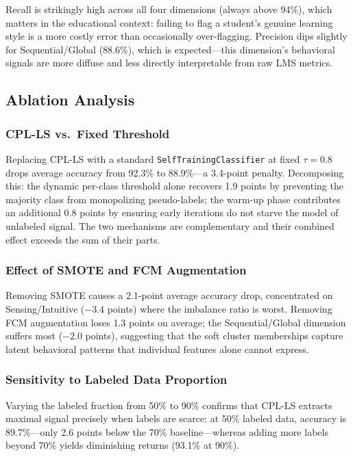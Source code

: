 \documentclass[journal, onecolumn]{IEEEtran}
\begin{document}
Recall is strikingly high across all four dimensions (always above 94\%), which matters in the educational context: failing to flag a student's genuine learning style is a more costly error than occasionally over-flagging. Precision dips slightly for Sequential/Global (88.6\%), which is expected---this dimension's behavioral signals are more diffuse and less directly interpretable from raw LMS metrics.

\subsection{Ablation Analysis}

\subsubsection{CPL-LS vs.\ Fixed Threshold}
Replacing CPL-LS with a standard \texttt{SelfTrainingClassifier} at fixed $\tau=0.8$ drops average accuracy from 92.3\% to 88.9\%---a 3.4-point penalty. Decomposing this: the dynamic per-class threshold alone recovers 1.9 points by preventing the majority class from monopolizing pseudo-labels; the warm-up phase contributes an additional 0.8 points by ensuring early iterations do not starve the model of unlabeled signal. The two mechanisms are complementary and their combined effect exceeds the sum of their parts.

\subsubsection{Effect of SMOTE and FCM Augmentation}
Removing SMOTE causes a 2.1-point average accuracy drop, concentrated on Sensing/Intuitive ($-3.4$ points) where the imbalance ratio is worst. Removing FCM augmentation loses 1.3 points on average; the Sequential/Global dimension suffers most ($-2.0$ points), suggesting that the soft cluster memberships capture latent behavioral patterns that individual features alone cannot express.

\subsubsection{Sensitivity to Labeled Data Proportion}
Varying the labeled fraction from 50\% to 90\% confirms that CPL-LS extracts maximal signal precisely when labels are scarce: at 50\% labeled data, accuracy is 89.7\%---only 2.6 points below the 70\% baseline---whereas adding more labels beyond 70\% yields diminishing returns (93.1\% at 90\%).
\end{document}
